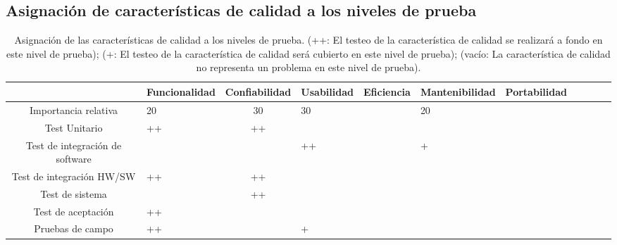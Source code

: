 \documentclass[
11pt, %
]{charter}
\begin{document}
\subsection{Asignación de características de calidad a los niveles de prueba}

\begin{table}[ht]
    \centering

       \begin{tabularx}{\linewidth}{@{}|c|X|c|X|c|X|c|X|c|X|c|@{}}\hline \hline
            \rowcolor[HTML]{d6c6c3}     
                   & \bf Funcionalidad  & \bf Confiabilidad & \bf Usabilidad & \bf
            Eficiencia                      & \bf Mantenibilidad & \bf Portabilidad                              \\ \hline
            \hline
            Importancia relativa            &          20        &            30     &       30       &     & 20 &
            \\
            Test Unitario                   &           ++       &           ++      &                &     &  & \\
            Test de integración de software &                    &                   &        ++        &     & + &
            \\
            Test de integración HW/SW       &           ++       &          ++       &                &     &  &
            \\
            Test de sistema                 &                    &           ++        &                &     &  & \\
            Test de aceptación              &           ++       &                   &                &     & 
             &
            \\
            Pruebas de campo                &          ++        &                 &        +        &     &  &
            \\ \hline
        \end{tabularx}
        \caption{Asignación de las características de calidad a los niveles de prueba. (++: El testeo de la característica de calidad
se realizará a fondo en este nivel de prueba); (+: El testeo de la característica de calidad será cubierto en este nivel de
prueba); (vacío: La característica de calidad no representa un problema en este nivel de prueba).}
  
    
\end{table}
\end{document}
